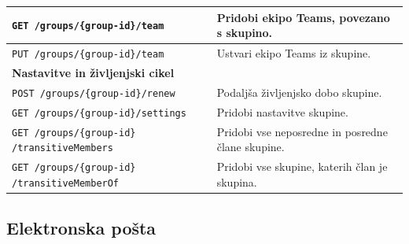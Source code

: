 \documentclass[a4paper, 12pt]{book}
\begin{document}
\begin{longtable}{|p{7cm}|p{7.5cm}|}
\texttt{GET /groups/\{group-id\}/team} &
Pridobi ekipo Teams, povezano s skupino. \\
\hline

\texttt{PUT /groups/\{group-id\}/team} &
Ustvari ekipo Teams iz skupine. \\
\hline

\multicolumn{2}{|l|}{\textbf{Nastavitve in življenjski cikel}} \\
\hline

\texttt{POST /groups/\{group-id\}/renew} &
Podaljša življenjsko dobo skupine. \\
\hline

\texttt{GET /groups/\{group-id\}/settings} &
Pridobi nastavitve skupine. \\
\hline

\texttt{GET /groups/\{group-id\}
/transitiveMembers} &
Pridobi vse neposredne in posredne člane skupine. \\
\hline

\texttt{GET /groups/\{group-id\}
/transitiveMemberOf} &
Pridobi vse skupine, katerih član je skupina. \\
\hline

\end{longtable}

\subsection{Elektronska pošta}
\end{document}
